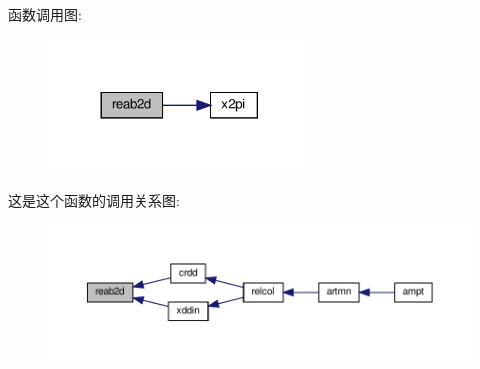 函数调用图\+:
\nopagebreak
\begin{figure}[H]
\begin{center}
\leavevmode
\includegraphics[width=197pt]{reab2d_8f90_a89c46eb31ac52e3e82ad1c87a8c9158f_cgraph}
\end{center}
\end{figure}
这是这个函数的调用关系图\+:
\nopagebreak
\begin{figure}[H]
\begin{center}
\leavevmode
\includegraphics[width=350pt]{reab2d_8f90_a89c46eb31ac52e3e82ad1c87a8c9158f_icgraph}
\end{center}
\end{figure}
